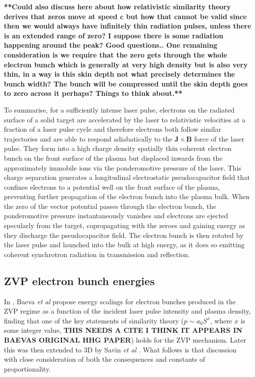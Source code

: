 \textbf{**Could also discuss here about how relativistic similarity theory derives that zeros move at speed c but how that cannot be valid since then we would always have infinitely thin radiation pulses, unless there is an extended range of zero? I suppose there is some radiation happening around the peak? Good questions..
One remaining consideration is we require that the zero gets through the whole electron bunch which is generally at very high density but is also very thin, in a way is this skin depth not what precisely determines the bunch width? The bunch will be compressed until the skin depth goes to zero across it perhaps? Things to think about.**}

To summarise, for a sufficiently intense laser pulse, electrons on the radiated surface of a solid target are accelerated by the laser to relativistic velocities at a fraction of a laser pulse cycle and therefore electrons both follow similar trajectories and are able to respond adiabatically to the $\mathbf{J}\times \mathbf{B}$ force of the laser pulse. They form into a high charge density spatially thin coherent electron bunch on the front surface of the plasma but displaced inwards from the approximately immobile ions via the ponderomotive pressure of the laser. This charge separation generates a longitudinal electrostatic pseudocapacitor field that confines electrons to a potential well on the front surface of the plasma, preventing further propagation of the electron bunch into the plasma bulk. When the zero of the vector potential passes through the electron bunch, the ponderomotive pressure instantaneously vanishes and electrons are ejected specularly from the target, copropagating with the zeroes and gaining energy as they discharge the pseudocapacitor field. The electron bunch is then rotated by the laser pulse and launched into the bulk at high energy, as it does so emitting coherent synchrotron radiation in transmission and reflection.

\subsection{ZVP electron bunch energies}\label{sec:zvp_energies_derivation}
In \cite{baevaZeroVectorPotential2011}, Baeva \textit{et al} propose energy scalings for electron bunches produced in the \ac{ZVP} regime as a function of the incident laser pulse intensity and plasma density, finding that one of the key statements of similarity theory ($p \sim a_0 S^x$, where $x$ is some integer value, \textbf{THIS NEEDS A CITE I THINK IT APPEARS IN BAEVAS ORIGINAL HHG PAPER}) holds for the \ac{ZVP} mechanism. Later this was then extended to \ac{3D} by Savin \textit{et al} \cite{savinAttosecondscaleAbsorptionExtreme2017}. What follows is that discussion with close consideration of both the consequences and constants of proportionality.

